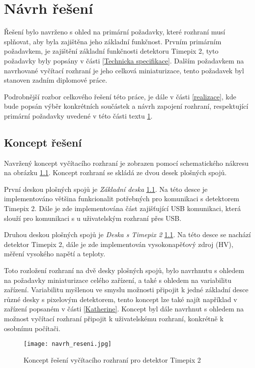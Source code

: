 \chapter{Návrh řešení} %
\label{Koncept reseni}
Řešení bylo navrženo s ohled na primární požadavky, které rozhraní musí splňovat, aby byla zajištěna jeho základní funkčnost. Prvním primárním požadavkem, je zajištění základní funkčnosti detektoru Timepix 2, tyto požadavky byly popsány v části \ref{Technicka specifikace}. Dalším požadavkem na navrhované vyčítací rozhraní je jeho celková miniaturizace, tento požadavek byl stanoven zadním diplomové práce.
\par Podrobnější rozbor celkového řešení této práce, je dále v části \ref{realizace}, kde bude popsán výběr konkrétních součástek a návrh zapojení rozhraní, respektující primární požadavky uvedené v této části textu \ref{Koncept reseni}.

\section{Koncept řešení}
Navržený koncept vyčítacího rozhraní je zobrazen pomocí schematického nákresu na obrázku \ref{fig:navrh_reseni}. Koncept rozhraní se skládá ze dvou desek plošných spojů. 
\par První deskou plošných spojů je \textit{Základní deska} \ref{fig:navrh_reseni}. Na této desce je implementováno většina funkcionalit potřebných pro komunikaci s detektorem Timepix 2. Dále je zde implementována část zajišťující USB komunikaci, která slouží pro komunikaci s u uživatelským rozhraní přes USB.
\par Druhou deskou plošných spojů je \textit{Deska s Timepix 2} \ref{fig:navrh_reseni}. Na této desce se nachází detektor Timepix 2, dále je zde implementován vysokonapěťový zdroj (HV), měření vysokého napětí a teploty.
\par Toto rozložení rozhraní na dvě desky plošných spojů, bylo navrhnutu s ohledem na požadavky miniaturizace celého zařízení, a také s ohledem na variabilitu zařízení. Variabilitu myšlenou ve smyslu možnosti připojit k jedné základní desce různé desky s pixelovým detektorem, tento koncept lze také najít například v zařízení popsaném v části \ref{Katherine}. Koncept byl dále navrhnut s ohledem na možnost vyčítací rozhraní připojit k uživatelskému rozhraní, konkrétně k osobnímu počítači.  
\begin{figure}[h!]
	\centering
	\captionsetup{justification=centering}
	\texttt{[image: navrh\_reseni.jpg]}
	\caption{Koncept řešení vyčítacího rozhraní pro detektor Timepix 2} 
	\label{fig:navrh_reseni}
\end{figure}

